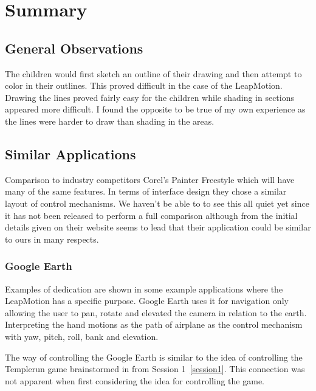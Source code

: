 
\chapter{Summary} %

\label{Chapter5} %



\section{General Observations}
The children would first sketch an outline of their drawing and then attempt to color in their outlines. This proved difficult in the case of the LeapMotion. Drawing the lines proved fairly easy for the children while shading in sections appeared more difficult. I found the opposite to be true of my own experience as the lines were harder to draw than shading in the areas.

\section{Similar Applications}

Comparison to industry competitors Corel's Painter Freestyle which will have many of the same features. In terms of interface design they chose a similar layout of control mechanisms. We haven't be able to to see this all quiet yet since it has not been released to perform a full comparison although from the initial details given on their website seems to lead that their application could be similar to ours in many respects. \cite{corel}

\subsection{Google Earth}
Examples of dedication are shown in some example applications where the LeapMotion has a specific purpose. Google Earth uses it for navigation only allowing the user to pan, rotate and elevated the camera in relation to the earth. Interpreting the hand motions as the path of airplane as the control mechanism with yaw, pitch, roll, bank and elevation. 

The way of controlling the Google Earth is similar to the idea of controlling the Templerun game brainstormed in from Session 1~\ref{session1}. This connection was not apparent when first considering the idea for controlling the game. 

